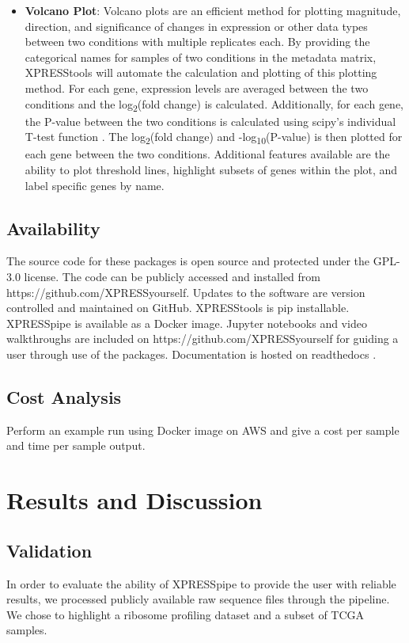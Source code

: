 \documentclass[11pt, a4paper, oneside]{article}
\begin{document}
\begin{itemize}
  \item \textbf{Volcano Plot}: Volcano plots are an efficient method for plotting magnitude, direction, and significance of changes in expression or other data types between two conditions with multiple replicates each. By providing the categorical names for samples of two conditions in the metadata matrix, XPRESStools will automate the calculation and plotting of this plotting method. For each gene, expression levels are averaged between the two conditions and the log\textsubscript{2}(fold change) is calculated. Additionally, for each gene, the P-value between the two conditions is calculated using scipy's individual T-test function \cite{scipy}. The log\textsubscript{2}(fold change) and -log\textsubscript{10}(P-value) is then plotted for each gene between the two conditions. Additional features available are the ability to plot threshold lines, highlight subsets of genes within the plot, and label specific genes by name.

\end{itemize}

\subsection{Availability}
The source code for these packages is open source and protected under the GPL-3.0 license. The code can be publicly accessed and installed from https://github.com/XPRESSyourself. Updates to the software are version controlled and maintained on GitHub. XPRESStools is pip installable. XPRESSpipe is available as a Docker image. Jupyter notebooks and video walkthroughs are included on https://github.com/XPRESSyourself for guiding a user through use of the packages. Documentation is hosted on readthedocs \cite{readthedocs}.

\subsection{Cost Analysis}
Perform an example run using Docker image on AWS and give a cost per sample and time per sample output.


\section{Results and Discussion}

\subsection{Validation}
In order to evaluate the ability of XPRESSpipe to provide the user with reliable results, we processed publicly available raw sequence files through the pipeline. We chose to highlight a ribosome profiling dataset and a subset of TCGA samples.
\end{document}
